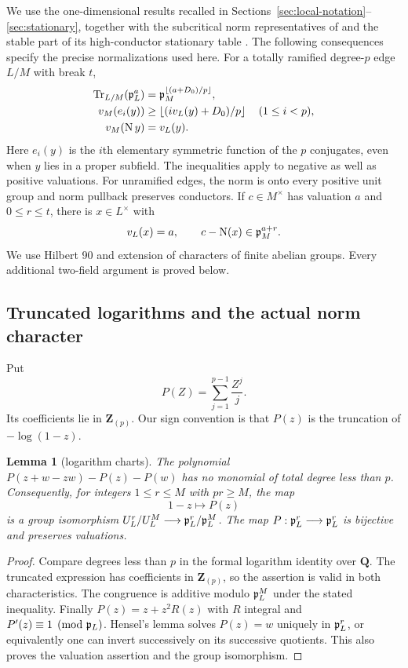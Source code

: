 \documentclass[11pt]{amsart}
\newtheorem{lemma}[theorem]{Lemma}
\theoremstyle{definition}
\theoremstyle{remark}
\newcommand{\Tr}{\operatorname{Tr}}
\newcommand{\Nm}{\operatorname{N}}
\newcommand{\floor}[1]{\left\lfloor #1\right\rfloor}
\begin{document}
We use the one-dimensional results recalled in
Sections~\ref{sec:local-notation}--\ref{sec:stationary}, together with
the subcritical norm representatives of \cite[Lemma~6.6]{Ueda} and
the stable part of its high-conductor stationary table
\cite[Proposition~6.8]{Ueda}.
The following consequences specify the precise normalizations used here.
For a totally ramified degree-$p$ edge $L/M$ with break $t$,
\begin{align}
 \Tr_{L/M}(\pp_L^a)&=\pp_M^{\floor{(a+D_0)/p}},\label{O:I:traceideal}\\
 v_M(e_i(y))&\ge\floor{(i v_L(y)+D_0)/p}\quad(1\le i<p),\label{O:I:symbound}\\
 v_M(\Nm y)&=v_L(y).\label{O:I:normval}
\end{align}
Here $e_i(y)$ is the $i$th elementary symmetric function of the $p$
conjugates, even when $y$ lies in a proper subfield. The inequalities apply
to negative as well as positive valuations. For unramified edges, the
norm is onto every positive unit group and norm pullback preserves
conductors. If $c\in M^\times$ has valuation $a$ and $0\le r\le t$, there
is $x\in L^\times$ with
\begin{equation}\label{O:I:normrep}
 v_L(x)=a,\qquad c-\Nm(x)\in\pp_M^{a+r}.
\end{equation}
We use Hilbert 90 and extension of characters of finite abelian groups.
Every additional two-field argument is proved below.

\subsection{Truncated logarithms and the actual norm character}
Put
\[
 P(Z)=\sum_{j=1}^{p-1}\frac{Z^j}{j}.
\]
Its coefficients lie in $\mathbf Z_{(p)}$. Our sign convention is that
$P(z)$ is the truncation of $-\log(1-z)$.

\begin{lemma}[logarithm charts]\label{O:I:logchart}
The polynomial
$P(z+w-zw)-P(z)-P(w)$ has no monomial of total degree less than $p$.
Consequently, for integers $1\le r\le M$ with $pr\ge M$, the map
\[
 1-z\longmapsto P(z)
\]
is a group isomorphism $U_L^r/U_L^M\longrightarrow
\mathfrak p_L^r/\mathfrak p_L^M$. The map $P:\mathfrak p_L^r\longrightarrow\mathfrak p_L^r$ is bijective
and preserves valuations.
\end{lemma}
\begin{proof}
Compare degrees less than $p$ in the formal logarithm identity over
$\mathbf Q$. The truncated expression has coefficients in
$\mathbf Z_{(p)}$, so the assertion is valid in both characteristics.
The congruence is additive modulo $\mathfrak p_L^M$ under the stated inequality.
Finally $P(z)=z+z^2R(z)$ with $R$ integral and $P'(z)\equiv1\pmod{\mathfrak p_L}$.
Hensel's lemma solves $P(z)=w$ uniquely in $\mathfrak p_L^r$, or equivalently one
can invert successively on its successive quotients. This also proves the
valuation assertion and the group isomorphism.
\end{proof}
\end{document}
